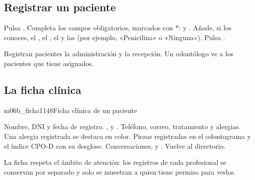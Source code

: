 \documentclass[11pt]{article}
\begin{document}
\subsection{Registrar un paciente}

\begin{pasos}
  \paso Pulsa  .
  \paso Completa los campos obligatorios, marcados con *:  y .
  \paso Añade, si los conoces, el , el , el  y las  (por ejemplo, «Penicilina» o «Ninguna»).
  \paso Pulsa .
\end{pasos}

\begin{sdpermiso}
Registran pacientes la administración y la recepción. Un odontólogo ve a los pacientes que tiene asignados.
\end{sdpermiso}

\needspace{0.55\textheight}
\subsection{La ficha clínica}

\begin{pantalla}{m06b_ficha}{1148}{Ficha clínica de un paciente}
\end{pantalla}

\begin{leyenda}
   Nombre, DNI y fecha de registro.
   ,  y .
   Teléfono, correo, tratamiento y alergias. Una alergia registrada se destaca en color.
   Piezas registradas en el odontograma y el índice CPO-D con su desglose.
   Conversaciones,  y .
   Vuelve al directorio.
\end{leyenda}

\begin{sdnota}
La ficha respeta el ámbito de atención: los registros de cada profesional se conservan por separado y solo se muestran a quien tiene permiso para verlos.
\end{sdnota}
\end{document}
